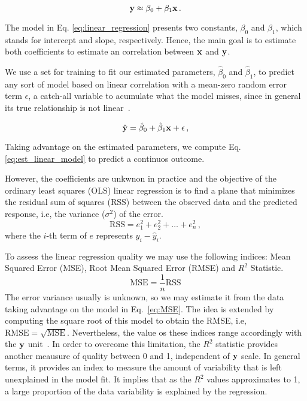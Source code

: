 \begin{equation}
{\bf y} \approx \beta_0 + \beta_1 {\bf x} \, . \label{eq:linear_regression}
\end{equation}

The model in Eq. \ref{eq:linear_regression} presents two constants, $\beta_0$ and $\beta_1$, which stands for intercept and slope, respectively. Hence, the main goal is to estimate both coefficients to estimate an correlation between ${\bf x}$ and ${\bf y}$.

We use a set for training to fit our estimated parameters, $\hat{\beta}_{0}$ and $\hat{\beta}_{1}$, to predict any sort of model based on linear correlation with a mean-zero random error term $\epsilon$, a catch-all variable to acumulate what the model misses, since in general its true relationship is not linear~\cite{James2013}.

\begin{equation}
\hat{{\bf y}} = \hat{\beta}_{0} + \hat{\beta}_{1} {\bf x} + {\bf \epsilon} \, ,
\label{eq:est_linear_model}
\end{equation}

Taking advantage on the estimated parameters, we compute Eq. \ref{eq:est_linear_model} to predict a continuos outcome. 

However, the coefficients are unkwnon in practice and the objective of the ordinary least squares (OLS) linear regression is to find a plane that minimizes the residual sum of squares (RSS) between the observed data and the predicted response, i.e, the variance ($\sigma^2$) of the error.     
\begin{equation}
  \text{RSS} = e_1^2 + e_2^2 + \dots + e_n^2 \, , \label{eq:RSS}
\end{equation}
where the $i$-th term of $e$ represents $y_i - \hat{y}_i$.

To assess the linear regression quality we may use the following indices: Mean Squared Error (MSE), Root Mean Squared Error (RMSE) and $R^2$ Statistic.
\begin{equation}
  \text{MSE} = \frac{1}{n} \text{RSS}
  \label{eq:MSE}
\end{equation}
The error variance usually is unknown, so we may estimate it from the data taking advantage on the model in Eq.~\ref{eq:MSE}. The idea is extended by computing the square root of this model to obtain the RMSE, i.e, $\text{RMSE} = \sqrt{\text{MSE}}$. Nevertheless, the value os these indices range accordingly with the ${\bf y}$ unit~\cite{Kuhn2013}. In order to overcome this limitation, the $R^2$ statistic provides another meausure of quality between 0 and 1, independent of ${\bf y}$ scale. In general terms, it provides an index to measure the amount of variability that is left unexplained in the model fit. It implies that as the $R^2$ values approximates to 1, a large proportion of the data variability is explained by the regression.

